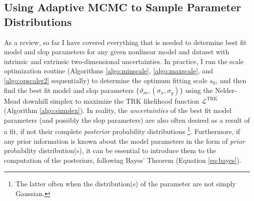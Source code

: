 \subsection{Using Adaptive MCMC to Sample Parameter Distributions}
\label{sec:MCMC}
As a review, so far I have covered everything that is needed to determine best fit model and slop parameters for any given nonlinear model and dataset with intrinsic and extrinsic two-dimensional uncertainties. In practice, I run the scale optimization routine (Algorithms \ref{algo:minscale}, \ref{algo:maxscale}, and \ref{algo:opscaler2} sequentially) to determine the optimum fitting scale $s_0$, and then find the best fit model and slop parameters $\{\vartheta_m,(\sigma_x,\sigma_y)\}$ using the Nelder-Mead downhill simplex to maximize the TRK likelihood function $\mathcal{L}^\text{TRK}$ (Algorithm \ref{algo:simplex}). In reality, the \textit{uncertainties} of the best fit model parameters (and possibly the slop parameters) are also often desired as a result of a fit, if not their complete \textit{posterior} probability distributions \footnote{The latter often when the distribution(s) of the parameter are not simply Gaussian.}. Furthermore, if any prior information is known about the model parameters in the form of \textit{prior} probability distribution(s), it can be essential to introduce them to the computation of the posteriors, following Bayes' Theorem (Equation \eqref{eq:bayes}).

